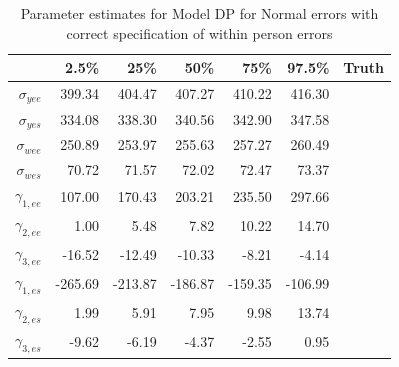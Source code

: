 \documentclass[11pt]{article}\usepackage[]{graphicx}\usepackage[]{color}
\begin{document}
% 
% 
\begin{table}[ht]
\centering
\begin{tabular}{rrrrrr|r}
  \hline
 & 2.5\% & 25\% & 50\% & 75\% & 97.5\% & Truth \\
  \hline
$\sigma_{yee}$ & 399.34 & 404.47 & 407.27 & 410.22 & 416.30 \\ 
  $\sigma_{yes}$ & 334.08 & 338.30 & 340.56 & 342.90 & 347.58 \\ 
  $\sigma_{wee}$ & 250.89 & 253.97 & 255.63 & 257.27 & 260.49 \\ 
  $\sigma_{wes}$ & 70.72 & 71.57 & 72.02 & 72.47 & 73.37 \\ 
  $\gamma_{1,ee}$ & 107.00 & 170.43 & 203.21 & 235.50 & 297.66 \\ 
  $\gamma_{2,ee}$ & 1.00 & 5.48 & 7.82 & 10.22 & 14.70 \\ 
  $\gamma_{3,ee}$ & -16.52 & -12.49 & -10.33 & -8.21 & -4.14 \\ 
  $\gamma_{1,es}$ & -265.69 & -213.87 & -186.87 & -159.35 & -106.99 \\ 
  $\gamma_{2,es}$ & 1.99 & 5.91 & 7.95 & 9.98 & 13.74 \\ 
  $\gamma_{3,es}$ & -9.62 & -6.19 & -4.37 & -2.55 & 0.95 \\ 
   \hline
\end{tabular}
\caption{Parameter estimates for Model DP for Normal errors with correct specification of within person errors}
\label{mdpwpestimates}
\end{table}
\end{document}

